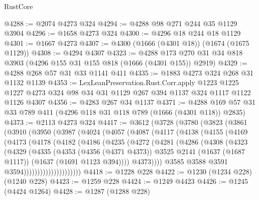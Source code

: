 \begin{lexlean}{RustCore}
\begin{coremodule}
@4288 := @2074 @4273 @324
@4294 := @4288 @98 @271 @244 @35 @1129 @3904
@4296 := @1658 @4273 @324
@4300 := @4296 @18 @244 @18 @1129
@4301 := @1667 @4273
@4307 := @4300 (@1666 (@4301 @18)) (@1674 (@1675 @1129))
@4308 := @4294 @4307
@4323 := @4288 @173 @270 @31 @34 @818 @3903 (@4296 @155 @31 @155 @818 (@1666 (@4301 @155)) @2919)
@4329 := @4288 @268 @57 @31 @33 @1141 @411
@4335 := @1883 @4273 @324 @268 @31 @1132 @1139
@4353 := LexLeanPreservation.Rust.Corr.apply
    @1223
    @1225
    @1227
    @4273
    @324
    @98
    @34
    @31
    @1129
    @267
    @394
    @1137
    @324
    @1117
    @1122
    @1126
    @4307
@4356 := @4283 @267 @34 @1137
@4371 := @4288 @169 @57 @31 @33 @789 @411 (@4296 @118 @31 @118 @789 (@1666 (@4301 @118)) @2835)
@4373 := @2113 @4273 @324
@4417 := @3612
    (@3728
      (@3780
        (@3823
          (@3861
            (@3910
              (@3950
                (@3987
                  (@4024
                    (@4057
                      (@4087
                        (@4117
                          (@4138
                            (@4155
                              (@4169
                                (@4173
                                  (@4178
                                    (@4182
                                      (@4186
                                        (@4235
                                          (@4272
                                            (@4281
                                              (@4286
                                                (@4308
                                                  (@4323
                                                    (@4329
                                                      (@4335
                                                        (@4353
                                                          (@4356 (@4371 @4373))
                                                          @3525
                                                          @2141
                                                          (@1637 (@1687 @1117))
                                                          (@1637 (@1691 @1123 @394))))
                                                      @4373))))
                                              @3585
                                              @3588
                                              @3591
                                              @3594)))))))))))))))))))))
@4418 := @1228 @228
@4422 := @1230 (@1234 @228) (@1240 @228)
@4423 := @1259 @228
@4424 := @1249 @4423
@4426 := @1245 (@4424 @1264)
@4428 := @1287 (@1288 @228)

\end{coremodule}
\end{lexlean}
